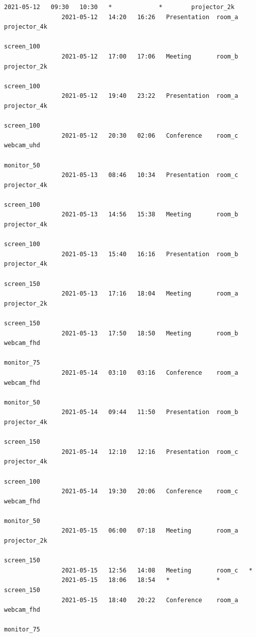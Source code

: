 \documentclass{article}
\begin{document}
\begin{Verbatim}[gobble=8]
                2021-05-12   09:30   10:30   *             *        projector_2k
                2021-05-12   14:20   16:26   Presentation  room_a   projector_4k
                                                                    screen_100
                2021-05-12   17:00   17:06   Meeting       room_b   projector_2k
                                                                    screen_100
                2021-05-12   19:40   23:22   Presentation  room_a   projector_4k
                                                                    screen_100
                2021-05-12   20:30   02:06   Conference    room_c   webcam_uhd
                                                                    monitor_50
                2021-05-13   08:46   10:34   Presentation  room_c   projector_4k
                                                                    screen_100
                2021-05-13   14:56   15:38   Meeting       room_b   projector_4k
                                                                    screen_100
                2021-05-13   15:40   16:16   Presentation  room_b   projector_4k
                                                                    screen_150
                2021-05-13   17:16   18:04   Meeting       room_a   projector_2k
                                                                    screen_150
                2021-05-13   17:50   18:50   Meeting       room_b   webcam_fhd
                                                                    monitor_75
                2021-05-14   03:10   03:16   Conference    room_a   webcam_fhd
                                                                    monitor_50
                2021-05-14   09:44   11:50   Presentation  room_b   projector_4k
                                                                    screen_150
                2021-05-14   12:10   12:16   Presentation  room_c   projector_4k
                                                                    screen_100
                2021-05-14   19:30   20:06   Conference    room_c   webcam_fhd
                                                                    monitor_50
                2021-05-15   06:00   07:18   Meeting       room_a   projector_2k
                                                                    screen_150
                2021-05-15   12:56   14:08   Meeting       room_c   *
                2021-05-15   18:06   18:54   *             *        screen_150
                2021-05-15   18:40   20:22   Conference    room_a   webcam_fhd
                                                                    monitor_75

\end{Verbatim}
\end{document}

